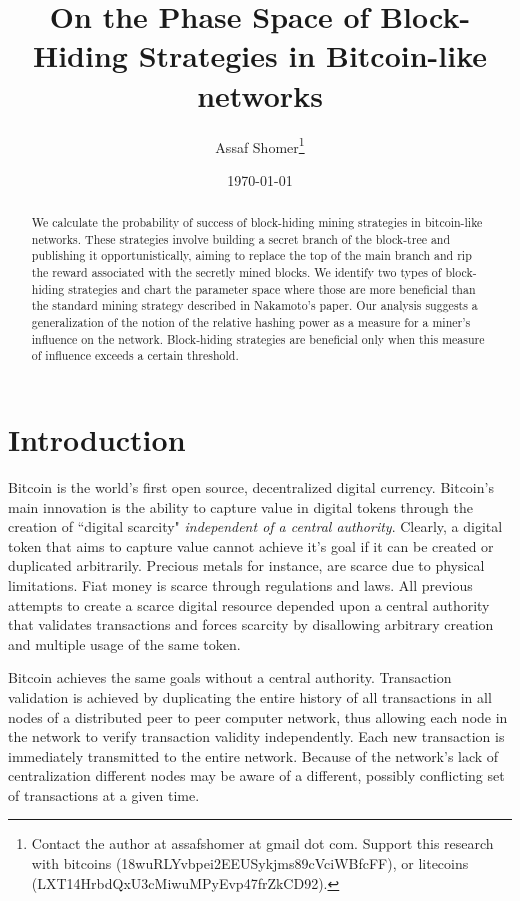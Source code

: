 \documentclass[letterpaper,12pt]{report}
\title{\textbf{On the Phase Space of Block-Hiding Strategies in Bitcoin-like networks}}
\author{Assaf Shomer\footnote{Contact the author at assafshomer at gmail dot com. Support this research with bitcoins (18wuRLYvbpei2EEUSykjms89cVciWBfcFF), or litecoins (LXT14HrbdQxU3cMiwuMPyEvp47frZkCD92).}\\
}
\date{\today}
\begin{document}
\maketitle

\begin{abstract}
We calculate the probability of success of block-hiding mining strategies in bitcoin-like networks.
These strategies involve building a secret branch of the block-tree and publishing it opportunistically, aiming to replace the top of the main branch and rip the reward associated with the secretly mined blocks. We identify two types of block-hiding strategies and chart the parameter space where those are more beneficial than the standard mining strategy described in Nakamoto's paper.
Our analysis suggests a generalization of the notion of the relative hashing power as a measure for a miner's influence on the network. Block-hiding strategies are beneficial only when this measure of influence exceeds a certain threshold.


\end{abstract}
\tableofcontents
\chapter{Introduction}\label{chap:intro}
Bitcoin is the world's first open source, decentralized digital currency. Bitcoin's main innovation is the ability to capture value in digital tokens through the creation of ``digital scarcity" \textit{independent of a central authority}. Clearly, a digital token that aims to capture value cannot achieve it's goal if it can be created or duplicated arbitrarily. Precious metals for instance, are scarce due to physical limitations. Fiat money is scarce through regulations and laws. All previous attempts to create a scarce digital resource depended upon a central authority that validates transactions and forces scarcity by disallowing arbitrary creation and multiple usage of the same token. 

Bitcoin achieves the same goals without a central authority. Transaction validation is achieved by duplicating the entire history of all transactions in all nodes of a distributed peer to peer computer network, thus allowing each node in the network to verify transaction validity independently. Each new transaction is immediately transmitted to the entire network. Because of the network's lack of centralization different nodes may be aware of a different, possibly conflicting set of transactions at a given time. 
\end{document}

